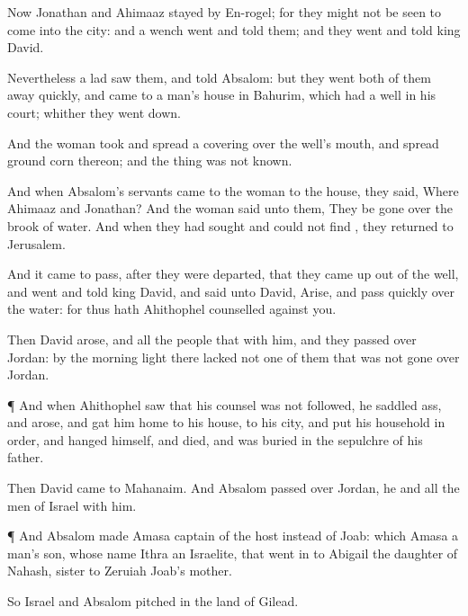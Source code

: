 {Now
Jonathan and
Ahimaaz
stayed by
En-rogel; for they
might not be
seen to
come into the
city: and a
wench
went and
told them; and they
went and
told
king
David.

Nevertheless a
lad
saw them, and
told
Absalom: but they
went
both of them away
quickly, and
came to a
man’s
house in
Bahurim, which had a
well in his
court;
whither they went
down.

And the
woman
took and
spread a
covering over the
well’s
mouth, and
spread ground
corn thereon; and the
thing was not
known.

And when
Absalom’s
servants
came to the
woman to the
house, they
said, Where
{}
Ahimaaz and
Jonathan? And the
woman
said unto them, They be gone
over the
brook of
water. And when they had
sought and could not
find
{}, they
returned to
Jerusalem.

And it came to pass,
after they were
departed, that they came
up out of the
well, and
went and
told
king
David, and
said unto
David,
Arise, and pass
quickly
over the
water: for thus hath
Ahithophel
counselled against you.


\par }{\PP {}Then
David
arose, and all the
people that
{} with him, and they passed
over
Jordan: by the
morning
light there
lacked not
one of them that was not gone
over
Jordan.


\par }{\PP {}¶ And when
Ahithophel
saw that his
counsel was not
followed, he
saddled
{}
ass, and
arose, and gat him
home to his
house, to his
city, and put his
household in
order, and
hanged himself, and
died, and was
buried in the
sepulchre of his
father.

Then
David
came to
Mahanaim. And
Absalom passed
over
Jordan, he and all the
men of
Israel with him.


\par }{\PP {}¶ And
Absalom
made
Amasa captain of the
host instead of
Joab: which
Amasa
{} a
man’s
son, whose
name
{}
Ithra an
Israelite, that went
in to
Abigail the
daughter of
Nahash,
sister to
Zeruiah
Joab’s
mother.

So
Israel and
Absalom
pitched in the
land of
Gilead.


}
